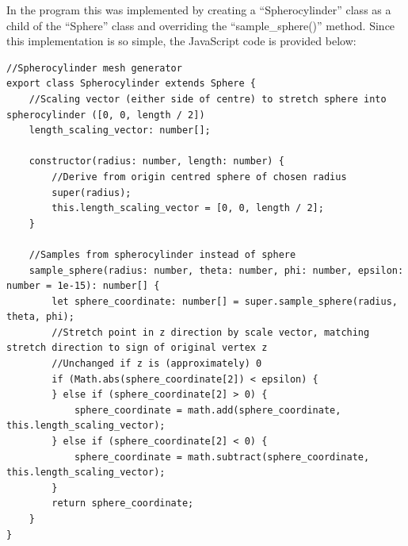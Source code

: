 In the program this was implemented by creating a ``Spherocylinder'' class as a child of the ``Sphere'' class and overriding the ``sample\_sphere()'' method. Since this implementation is so simple, the JavaScript code is provided below:

\begin{adjustbox}{width=\textwidth}
\begin{lstlisting}
//Spherocylinder mesh generator
export class Spherocylinder extends Sphere {
    //Scaling vector (either side of centre) to stretch sphere into spherocylinder ([0, 0, length / 2])
    length_scaling_vector: number[];

    constructor(radius: number, length: number) {
        //Derive from origin centred sphere of chosen radius
        super(radius);
        this.length_scaling_vector = [0, 0, length / 2];
    }

    //Samples from spherocylinder instead of sphere
    sample_sphere(radius: number, theta: number, phi: number, epsilon: number = 1e-15): number[] {
        let sphere_coordinate: number[] = super.sample_sphere(radius, theta, phi);
        //Stretch point in z direction by scale vector, matching stretch direction to sign of original vertex z
        //Unchanged if z is (approximately) 0
        if (Math.abs(sphere_coordinate[2]) < epsilon) {
        } else if (sphere_coordinate[2] > 0) {
            sphere_coordinate = math.add(sphere_coordinate, this.length_scaling_vector);
        } else if (sphere_coordinate[2] < 0) {
            sphere_coordinate = math.subtract(sphere_coordinate, this.length_scaling_vector);
        }
        return sphere_coordinate;
    }
}
\end{lstlisting}
\end{adjustbox}

